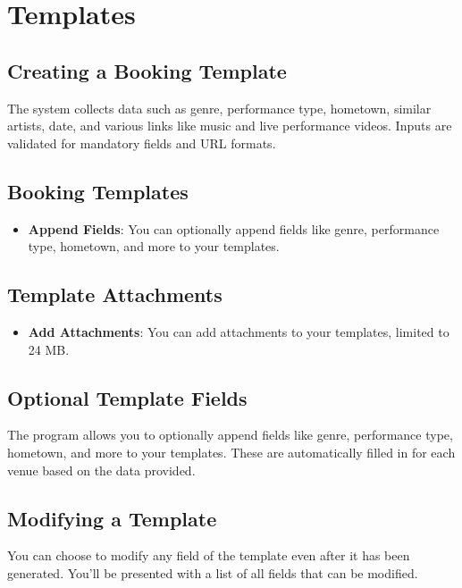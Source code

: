 \documentclass{article}
\begin{document}
	\section{Templates}
	
	\subsection{Creating a Booking Template}
	
	The system collects data such as genre, performance type, hometown, similar artists, date, and various links like music and live performance videos. Inputs are validated for mandatory fields and URL formats.
	
	\subsection{Booking Templates}
	
	\begin{itemize}
		\item \textbf{Append Fields}: You can optionally append fields like genre, performance type, hometown, and more to your templates.
	\end{itemize}
	
	\subsection{Template Attachments}
	
	\begin{itemize}
		\item \textbf{Add Attachments}: You can add attachments to your templates, limited to 24 MB.
	\end{itemize}
	
	\subsection{Optional Template Fields}
	
	The program allows you to optionally append fields like genre, performance type, hometown, and more to your templates. These are automatically filled in for each venue based on the data provided.
	
	\subsection{Modifying a Template}
	
	You can choose to modify any field of the template even after it has been generated. You'll be presented with a list of all fields that can be modified.
	
\end{document}
